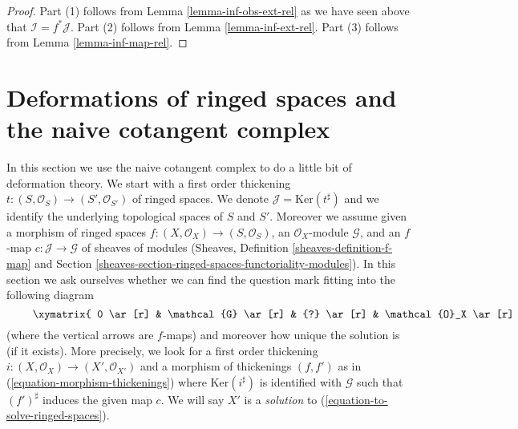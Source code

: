 \begin{proof}
Part (1) follows from Lemma \ref{lemma-inf-obs-ext-rel}
as we have seen above that $\mathcal{I} = f^*\mathcal{J}$.
Part (2) follows from Lemma \ref{lemma-inf-ext-rel}.
Part (3) follows from Lemma \ref{lemma-inf-map-rel}.
\end{proof}








\section{Deformations of ringed spaces and the naive cotangent complex}
\label{section-deformations-ringed-spaces}

\noindent
In this section we use the naive cotangent complex to do a little bit
of deformation theory. We start with a first order thickening
$t : (S, \mathcal{O}_S) \to (S', \mathcal{O}_{S'})$ of ringed spaces.
We denote $\mathcal{J} = \text{Ker}(t^\sharp)$ and we
identify the underlying topological spaces of $S$ and $S'$.
Moreover we assume given a morphism of ringed spaces
$f : (X, \mathcal{O}_X) \to (S, \mathcal{O}_S)$, an $\mathcal{O}_X$-module
$\mathcal{G}$, and an $f$-map $c : \mathcal{J} \to \mathcal{G}$
of sheaves of modules (Sheaves, Definition \ref{sheaves-definition-f-map}
and Section \ref{sheaves-section-ringed-spaces-functoriality-modules}).
In this section we ask ourselves whether we can find
the question mark fitting into the following diagram
\begin{equation}
\label{equation-to-solve-ringed-spaces}
\vcenter{
\xymatrix{
0 \ar[r] & \mathcal{G} \ar[r] & {?} \ar[r] & \mathcal{O}_X \ar[r] & 0 \\
0 \ar[r] & \mathcal{J} \ar[u]^c \ar[r] & \mathcal{O}_{S'} \ar[u] \ar[r] &
\mathcal{O}_S \ar[u] \ar[r] & 0
}
}
\end{equation}
(where the vertical arrows are $f$-maps)
and moreover how unique the solution is (if it exists). More precisely,
we look for a first order thickening
$i : (X, \mathcal{O}_X) \to (X', \mathcal{O}_{X'})$
and a morphism of thickenings $(f, f')$ as in
(\ref{equation-morphism-thickenings})
where $\text{Ker}(i^\sharp)$ is identified with $\mathcal{G}$
such that $(f')^\sharp$ induces the given map $c$.
We will say $X'$ is a {\it solution} to
(\ref{equation-to-solve-ringed-spaces}).

